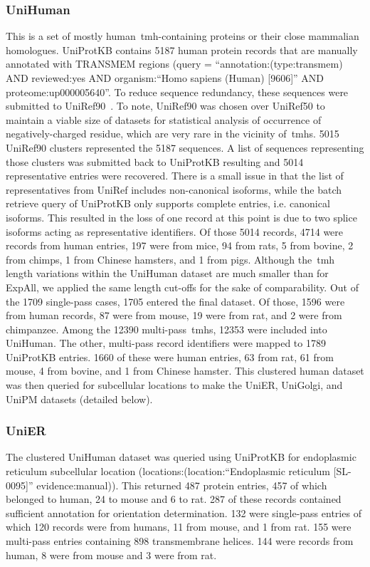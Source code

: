 \subsubsection{UniHuman}
This is a set of mostly human~\gls{tmh}-containing proteins or their close mammalian homologues.
UniProtKB contains 5187 human protein records that are manually annotated with TRANSMEM regions (query = ``annotation:(type:transmem) AND reviewed:yes AND organism:``Homo sapiens (Human) [9606]'' AND proteome:up000005640''.
To reduce sequence redundancy, these sequences were submitted to UniRef90~\cite{Suzek2015}.
To note, UniRef90 was chosen over UniRef50 to maintain a viable size of datasets for statistical analysis of occurrence of negatively\--charged residue, which are very rare in the vicinity of~\gls{tmh}s.
5015 UniRef90 clusters represented the 5187 sequences.
A list of sequences representing those clusters was submitted back to UniProtKB resulting and 5014 representative entries were recovered.
There is a small issue in that the list of representatives from UniRef includes non-canonical isoforms, while the batch retrieve query of UniProtKB only supports complete entries, i.e.
canonical isoforms.
This resulted in the loss of one record at this point is due to two splice isoforms acting as representative identifiers.
Of those 5014 records, 4714 were records from human entries, 197 were from mice, 94 from rats, 5 from bovine, 2 from chimps, 1 from Chinese hamsters, and 1 from pigs.
Although the~\gls{tmh} length variations within the UniHuman dataset are much smaller than for ExpAll, we applied the same length cut-offs for the sake of comparability.
Out of the 1709 single\--pass cases, 1705 entered the final dataset.
Of those, 1596 were from human records, 87 were from mouse, 19 were from rat, and 2 were from chimpanzee.
Among the 12390 multi\--pass~\gls{tmh}s, 12353 were included into UniHuman.
The other, multi\--pass record identifiers were mapped to 1789 UniProtKB entries.
1660 of these were human entries, 63 from rat, 61 from mouse, 4 from bovine, and 1 from Chinese hamster.
This clustered human dataset was then queried for subcellular locations to make the UniER, UniGolgi, and UniPM datasets (detailed below).

\subsubsection{UniER}
The clustered UniHuman dataset was queried using UniProtKB for endoplasmic reticulum subcellular location (locations:(location:``Endoplasmic reticulum [SL-0095]'' evidence:manual)).
This returned 487 protein entries, 457 of which belonged to human, 24 to mouse and 6 to rat.
287 of these records contained sufficient annotation for orientation determination.
132 were single\--pass entries of which 120 records were from humans, 11 from mouse, and 1 from rat.
155 were multi\--pass entries containing 898 transmembrane helices.
144 were records from human, 8 were from mouse and 3 were from rat.

